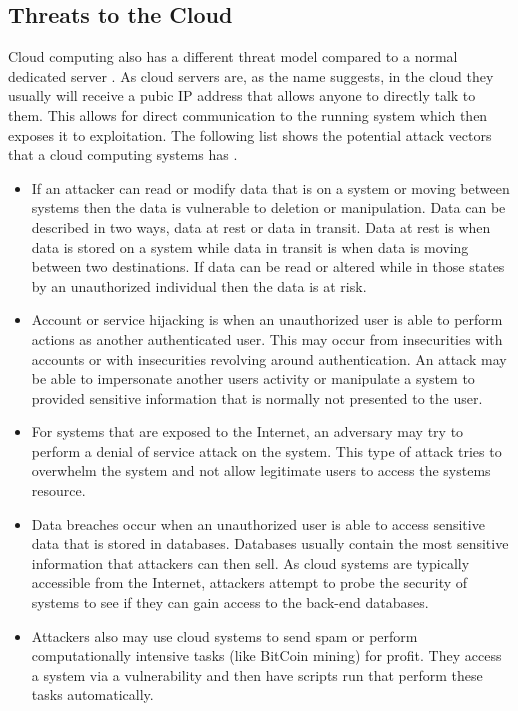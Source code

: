 \documentclass[12pt]{article}
\begin{document}
\subsection{Threats to the Cloud}
Cloud computing also has a different threat model compared to a normal dedicated server \cite{zissis2012addressing, mishra2013cloud, krutz2010cloud}. As cloud servers are, as the name suggests, in the cloud they usually will receive a pubic IP address that allows anyone to directly talk to them. This allows for direct communication to the running system which then exposes it to exploitation. The following list shows the potential attack vectors that a cloud computing systems has \cite{amini2015threat}.

\begin{itemize}
    \item If an attacker can read or modify data that is on a system or moving between systems then the data is vulnerable to deletion or manipulation.  Data can be described in two ways, data at rest or data in transit. Data at rest is when data is stored on a system while data in transit is when data is moving between two destinations. If data can be read or altered while in those states by an unauthorized individual then the data is at risk.
    \item Account or service hijacking is when an unauthorized user is able to perform actions as another authenticated user. This may occur from insecurities with accounts or with insecurities revolving around authentication. An attack may be able to impersonate another users activity or manipulate a system to provided sensitive information that is normally not presented to the user.
    \item For systems that are exposed to the Internet, an adversary may try to perform a denial of service attack on the system. This type of attack tries to overwhelm the system and not allow legitimate users to access the systems resource.
    \item Data breaches occur when an unauthorized user is able to access sensitive data that is stored in databases. Databases usually contain the most sensitive information that attackers can then sell. As cloud systems are typically accessible from the Internet, attackers attempt to probe the security of systems to see if they can gain access to the back-end databases.
    \item Attackers also may use cloud systems to send spam or perform computationally intensive tasks (like BitCoin mining) for profit. They access a system via a vulnerability and then have scripts run that perform these tasks automatically.
\end{itemize}
\end{document}
